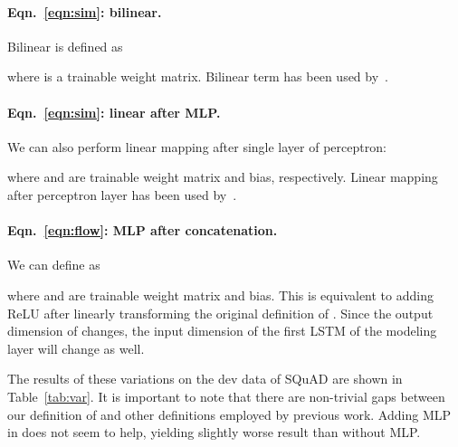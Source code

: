 \documentclass{article} \usepackage{iclr2017_conference,times}
\begin{document}
\paragraph{Eqn.~\ref{eqn:sim}: bilinear.} 
Bilinear  is defined as

where  is a trainable weight matrix. 
Bilinear term has been used by~\cite{thorough}.

\paragraph{Eqn.~\ref{eqn:sim}: linear after MLP.} 
We can also perform linear mapping after single layer of perceptron:

where  and  are trainable weight matrix and bias, respectively.
Linear mapping after perceptron layer has been used by~\cite{Hermann2015TeachingMT}.

\paragraph{Eqn.~\ref{eqn:flow}: MLP after concatenation.}
We can define  as

where  and  are trainable weight matrix and bias.
This is equivalent to adding ReLU after linearly transforming the original definition of .
Since the output dimension of  changes, the input dimension of the first LSTM of the modeling layer will change as well.


The results of these variations on the dev data of SQuAD are shown in Table~\ref{tab:var}.
It is important to note that there are non-trivial gaps between our definition of  and other definitions employed by previous work.
Adding MLP in  does not seem to help, yielding slightly worse result than  without MLP. 
\end{document}
